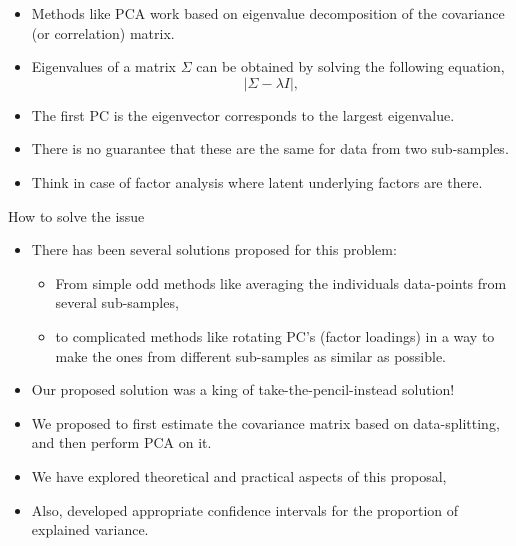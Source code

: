 \documentclass{beamer}
\begin{document}
\begin{frame}
\begin{itemize}
\item Methods like PCA work based on eigenvalue decomposition of the covariance (or correlation) matrix. 
\item Eigenvalues of a matrix $\Sigma$ can be obtained by solving the following equation,
		$$|\Sigma-\lambda I|,$$ 
\item The first PC is the eigenvector corresponds to the largest eigenvalue.\pause
\item There is no guarantee that these are the same for data from two sub-samples.
\item Think in case of factor analysis where latent underlying factors are there.
\end{itemize}
\end{frame}

\begin{frame}{How to solve the issue}
\begin{itemize}
\item There has been several solutions proposed for this problem:
\begin{itemize}
\item From simple odd methods like averaging the individuals data-points from several sub-samples,
\item to complicated methods like rotating PC's (factor loadings) in a way to make the ones from different sub-samples as similar as possible.
\end{itemize}
\item Our proposed solution was a king of take-the-pencil-instead solution!\pause
\item We proposed to first estimate the covariance matrix based on data-splitting, and then perform PCA on it.
\item We have explored theoretical and practical aspects of this proposal,
\item Also, developed appropriate confidence intervals for the proportion of explained variance.
\end{itemize}
\end{frame}
\end{document}
